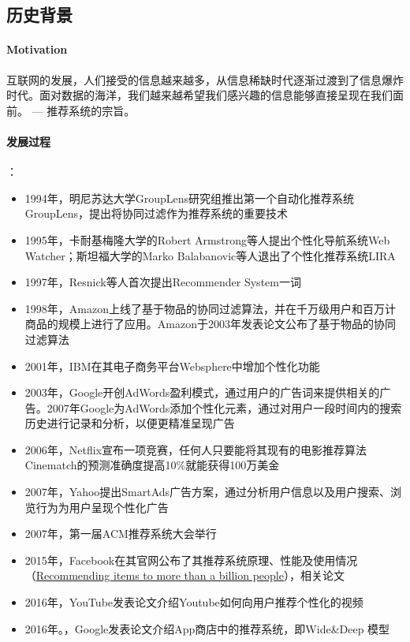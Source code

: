 \subsection{历史背景}
\paragraph{Motivation}互联网的发展，人们接受的信息越来越多，从信息稀缺时代逐渐过渡到了信息爆炸时代。面对数据的海洋，我们越来越希望我们感兴趣的信息能够直接呈现在我们面前。 --- 推荐系统的宗旨。

\paragraph{发展过程}：
\begin{itemize}
	\item 1994年，明尼苏达大学GroupLens研究组推出第一个自动化推荐系统GroupLens，提出将协同过滤作为推荐系统的重要技术
	\item 1995年，卡耐基梅隆大学的Robert Armstrong等人提出个性化导航系统Web Watcher；斯坦福大学的Marko Balabanovic等人退出了个性化推荐系统LIRA
	\item 1997年，Resnick等人首次提出Recommender System一词
 	\item 1998年，Amazon上线了基于物品的协同过滤算法，并在千万级用户和百万计商品的规模上进行了应用。Amazon于2003年发表论文\cite{linden2003amazon.com}公布了基于物品的协同过滤算法
	\item 2001年，IBM在其电子商务平台Websphere中增加个性化功能
	\item 2003年，Google开创AdWords盈利模式，通过用户的广告词来提供相关的广告。2007年Google为AdWords添加个性化元素，通过对用户一段时间内的搜索历史进行记录和分析，以便更精准呈现广告
	\item 2006年，Netflix宣布一项竞赛，任何人只要能将其现有的电影推荐算法Cinematch的预测准确度提高10\%就能获得100万美金
	\item 2007年，Yahoo提出SmartAds广告方案，通过分析用户信息以及用户搜索、浏览行为为用户呈现个性化广告
	\item 2007年，第一届ACM推荐系统大会举行
	\item 2015年，Facebook在其官网公布了其推荐系统原理、性能及使用情况（\href{https://engineering.fb.com/2015/06/02/core-data/recommending-items-to-more-than-a-billion-people/}{Recommending items to more than a billion people}），相关论文\cite{he2014practical}
	\item 2016年，YouTube发表论文\cite{covington2016deep}介绍Youtube如何向用户推荐个性化的视频
	\item 2016年。，Google发表论文\cite{cheng2016wide}介绍App商店中的推荐系统，即Wide\&Deep 模型
\end{itemize}

